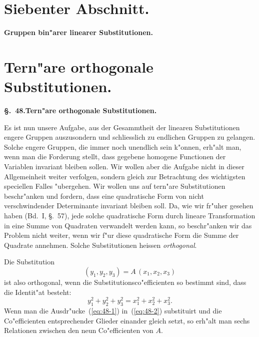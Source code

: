 \documentclass[12pt,a4paper]{article}
\theoremstyle{definition}
\begin{document}
\newpage
\section*{Siebenter Abschnitt.}

\begin{center}
\Large\textbf{Gruppen bin"arer linearer Substitutionen.}
\end{center}

\section{Tern"are orthogonale Substitutionen.}\label{sec:48}

\noindent\textbf{\S.~48.}\quad\textbf{Tern"are orthogonale Substitutionen.}
\vspace{0.3cm}

Es ist nun unsere Aufgabe, aus der Gesammtheit der linearen Substitutionen engere Gruppen auszusondern und schliesslich zu endlichen Gruppen zu gelangen. Solche engere Gruppen, die immer noch unendlich sein k"onnen, erh"alt man, wenn man die Forderung stellt, dass gegebene homogene Functionen der Variablen invariant bleiben sollen. Wir wollen aber die Aufgabe nicht in dieser Allgemeinheit weiter verfolgen, sondern gleich zur Betrachtung des wichtigsten speciellen Falles "ubergehen. Wir wollen uns auf tern"are Substitutionen beschr"anken und fordern, dass eine quadratische Form von nicht verschwindender Determinante invariant bleiben soll. Da, wie wir fr"uher gesehen haben (Bd.~I, \S.~57), jede solche quadratische Form durch lineare Transformation in eine Summe von Quadraten verwandelt werden kann, so beschr"anken wir das Problem nicht weiter, wenn wir f"ur diese quadratische Form die Summe der Quadrate annehmen. Solche Substitutionen heissen \emph{orthogonal}.

Die Substitution
\begin{equation}\label{eq:48-1}
(y_1, y_2, y_3) = A\,(x_1, x_2, x_3)
\end{equation}
ist also orthogonal, wenn die Substitutionsco"efficienten so bestimmt sind, dass die Identit"at besteht:
\begin{equation}\label{eq:48-2}
y_1^2 + y_2^2 + y_3^2 = x_1^2 + x_2^2 + x_3^2.
\end{equation}
Wenn man die Ausdr"ucke~(\ref{eq:48-1}) in~(\ref{eq:48-2}) substituirt und die Co"efficienten entsprechender Glieder einander gleich setzt, so erh"alt man sechs Relationen zwischen den neun Co"efficienten von $A$.
\end{document}
